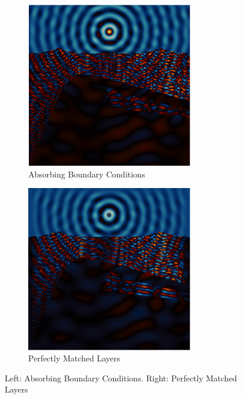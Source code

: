 \begin{figure}[ht]
	\centering
	\begin{subfigure}{0.5\textwidth}
		\centering
		\includegraphics[width=0.8\textwidth]{Images/ABC.png}
		\caption{Absorbing Boundary Conditions}
		\label{fig:ABC}
	\end{subfigure}%
	\begin{subfigure}{0.5\textwidth}
		\centering
		\includegraphics[width=0.8\textwidth]{Images/PML.png}
		\caption{Perfectly Matched Layers}
		\label{PML}
	\end{subfigure}
	\caption{Left: Absorbing Boundary Conditions. Right: Perfectly Matched Layers}
	\label{fig:ABC-PML}
\end{figure}

